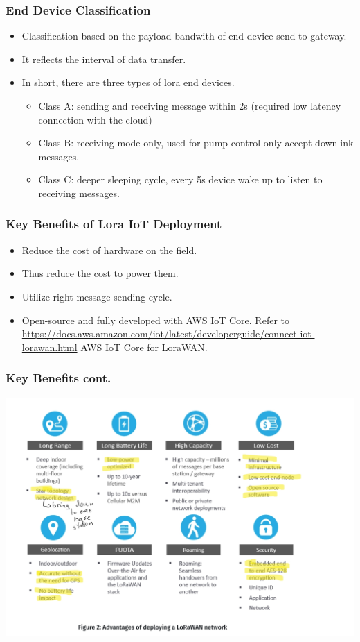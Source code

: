 \documentclass{beamer}
\begin{document}
\begin{frame}[t]
  \frametitle{End Device Classification}
 \begin{itemize}
   \item Classification based on the payload bandwith of end device send to gateway.
   \item It reflects the interval of data transfer. 
   \item In short, there are three types of lora end devices.
     \begin{itemize}
       \item Class A: sending and receiving message within 2s (required low latency connection with the cloud)
       \item Class B: receiving mode only, used for pump control only accept downlink messages.
       \item Class C: deeper sleeping cycle, every 5s device wake up to listen to receiving messages.
     \end{itemize}
 \end{itemize} 
\end{frame}

\begin{frame}[t]
  \frametitle{Key Benefits of Lora IoT Deployment}
  \begin{itemize}
    \item Reduce the cost of hardware on the field.
    \item Thus reduce the cost to power them.
    \item Utilize right message sending cycle.
    \item Open-source and fully developed with AWS IoT Core. Refer to \url{https://docs.aws.amazon.com/iot/latest/developerguide/connect-iot-lorawan.html} AWS IoT Core for LoraWAN.
  \end{itemize}
\end{frame}

\begin{frame}[t]
  \frametitle{Key Benefits cont.}
  \begin{center}
  \includegraphics[scale=0.15]{Advantages-deploying-lora.jpg}
  \end{center}
\end{frame}
\end{document}
